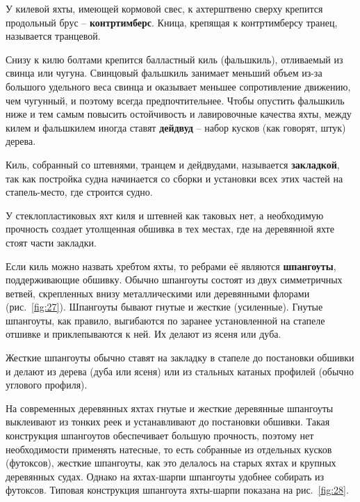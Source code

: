 \documentclass[a4paper, 12pt, twoside, final]{scrbook}
\begin{document}
У килевой яхты, имеющей кормовой свес, к ахтерштвеню сверху крепится
продольный брус \--- \textbf{контртимберс}. Кница, крепящая к контртимберсу
транец, называется транцевой.

Снизу к килю болтами крепится балластный киль (фальшкиль), отливаемый
из свинца или чугуна. Свинцовый фальшкиль занимает меньший объем из-за
большого удельного веса свинца и оказывает меньшее сопротивление движению,
чем чугунный, и поэтому всегда предпочтительнее. Чтобы опустить фальшкиль
ниже и тем самым повысить остойчивость и лавировочные качества яхты,
между килем и фальшкилем иногда ставят \textbf{дейдвуд} \--- набор кусков
(как говорят, штук) дерева.

Киль, собранный со штевнями, транцем и дейдвудами, называется \textbf{закладкой},
так как постройка судна начинается со сборки и установки всех этих
частей на стапель-место, где строится судно.

У стеклопластиковых яхт киля и штевней как таковых нет, а необходимую
прочность создает утолщенная обшивка в тех местах, где на деревянной
яхте стоят части закладки.

Если киль можно назвать хребтом яхты, то ребрами её являются \textbf{шпангоуты},
поддерживающие обшивку. Обычно шпангоуты состоят из двух симметричных
ветвей, скрепленных внизу металлическими или деревянными флорами (рис.~\ref{fig:27}).
Шпангоуты бывают гнутые и жесткие (усиленные). Гнутые шпангоуты, как
правило, выгибаются по заранее установленной на стапеле отшивке и
приклепываются к ней. Их делают из ясеня или дуба.

Жесткие шпангоуты обычно ставят на закладку в стапеле до постановки
обшивки и делают из дерева (дуба или ясеня) или из стальных катаных
профилей (обычно углового профиля).

На современных деревянных яхтах гнутые и жесткие деревянные шпангоуты
выклеивают из тонких реек и устанавливают до постановки обшивки. Такая
конструкция шпангоутов обеспечивает большую прочность, поэтому нет
необходимости применять натесные, то есть собранные из отдельных кусков
(футоксов), жесткие шпангоуты, как это делалось на старых яхтах и
крупных деревянных судах. Однако на яхтах-шарпи шпангоуты удобнее
собирать из футоксов. Типовая конструкция шпангоута яхты-шарпи показана
на рис.~\ref{fig:28}.
\end{document}

